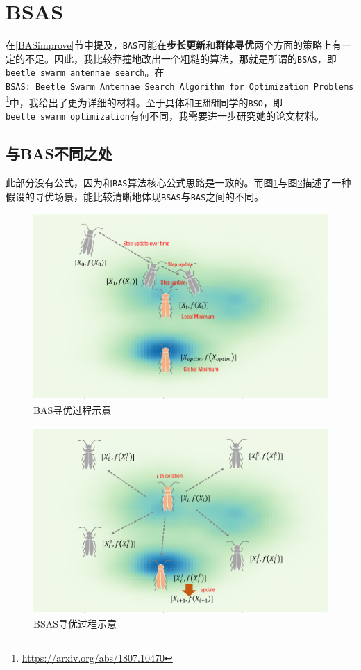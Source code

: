 \documentclass[]{ctexbook}
\renewcommand{\href}[2]{#2\footnote{\url{#1}}}
\begin{document}
\section{BSAS}\label{bsas}

在\ref{BASimprove}节中提及，\texttt{BAS}可能在\textbf{步长更新}和\textbf{群体寻优}两个方面的策略上有一定的不足。因此，我比较莽撞地改出一个粗糙的算法，那就是所谓的\texttt{BSAS}，即\texttt{beetle\ swarm\ antennae\ search}。在\href{https://arxiv.org/abs/1807.10470}{\texttt{BSAS:\ Beetle\ Swarm\ Antennae\ Search\ Algorithm\ for\ Optimization\ Problems}}中，我给出了更为详细的材料。至于具体和\texttt{王甜甜}同学的\texttt{BSO}，即\texttt{beetle\ swarm\ optimization}有何不同，我需要进一步研究她的论文材料。

\subsection{与BAS不同之处}\label{BSASflow}

此部分没有公式，因为和\texttt{BAS}算法核心公式思路是一致的。而图\ref{fig:basflow}与图\ref{fig:bsasflow}描述了一种假设的寻优场景，能比较清晰地体现\texttt{BSAS}与\texttt{BAS}之间的不同。

\begin{figure}

{\centering \includegraphics[width=0.8\linewidth]{img/BAS} 

}

\caption{BAS寻优过程示意}\label{fig:basflow}
\end{figure}

\begin{figure}

{\centering \includegraphics[width=0.8\linewidth]{img/BSAS} 

}

\caption{BSAS寻优过程示意}\label{fig:bsasflow}
\end{figure}
\end{document}
